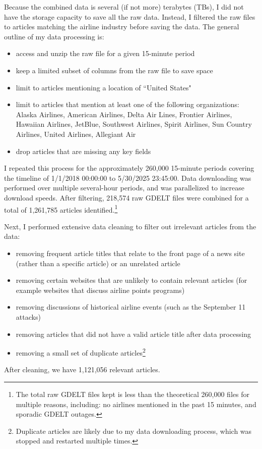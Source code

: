 \documentclass[12pt]{article}
\begin{document}
Because the combined data is several (if not more) terabytes (TBs), I did not have the storage capacity to save all the raw data. Instead, I filtered the raw files to articles matching the airline industry before saving the data. The general outline of my data processing is:
\begin{itemize}
\singlespacing
    \item access and unzip the raw file for a given 15-minute period
    \item keep a limited subset of columns from the raw file to save space
    \item limit to articles mentioning a location of ``United States"
    \item limit to articles that mention at least one of the following organizations: Alaska Airlines, American Airlines, Delta Air Lines, Frontier Airlines, Hawaiian Airlines, JetBlue, Southwest Airlines, Spirit Airlines, Sun Country Airlines, United Airlines, Allegiant Air
    \item drop articles that are missing any key fields
\end{itemize}
I repeated this process for the approximately 260,000 15-minute periods covering the timeline of 1/1/2018 00:00:00 to 5/30/2025 23:45:00. Data downloading was performed over multiple several-hour periods, and was parallelized to increase download speeds. After filtering, 218,574 raw GDELT files were combined for a total of 1,261,785 articles identified.\footnote{The total raw GDELT files kept is less than the theoretical 260,000 files for multiple reasons, including: no airlines mentioned in the past 15 minutes, and sporadic GDELT outages.}

Next, I performed extensive data cleaning to filter out irrelevant articles from the data:
\begin{itemize}
\singlespacing
    \item removing frequent article titles that relate to the front page of a news site (rather than a specific article) or an unrelated article
    \item removing certain websites that are unlikely to contain relevant articles (for example websites that discuss airline points programs)
    \item removing discussions of historical airline events (such as the September 11 attacks)
    \item removing articles that did not have a valid article title after data processing
    \item removing a small set of duplicate articles\footnote{Duplicate articles are likely due to my data downloading process, which was stopped and restarted multiple times.}
\end{itemize}
After cleaning, we have 1,121,056 relevant articles.
\end{document}
